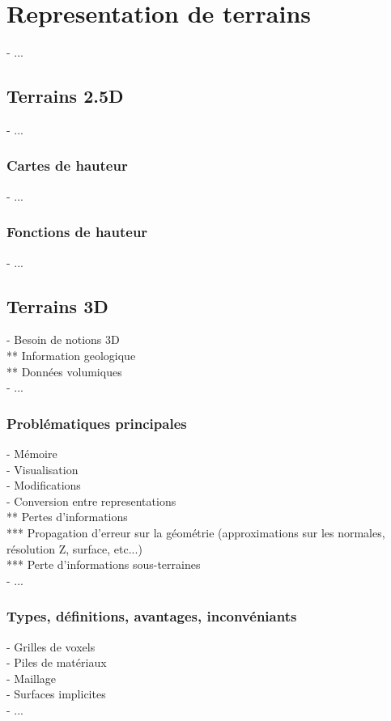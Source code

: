 \section{Representation de terrains}
- ...

\subsection{Terrains 2.5D}
- ...

\subsubsection{Cartes de hauteur}
- ...

\subsubsection{Fonctions de hauteur}
- ...

\subsection{Terrains 3D}
- Besoin de notions 3D \\
** Information geologique \\
** Données volumiques \\
- ...

\subsubsection{Problématiques principales}
- Mémoire \\
- Visualisation \\
- Modifications \\
- Conversion entre representations \\
** Pertes d'informations \\
*** Propagation d'erreur sur la géométrie (approximations sur les normales, résolution Z, surface, etc...) \\
*** Perte d'informations sous-terraines \\
- ...


\subsubsection{Types, définitions, avantages, inconvéniants}
- Grilles de voxels \\
- Piles de matériaux \\
- Maillage \\
- Surfaces implicites \\
- ...

